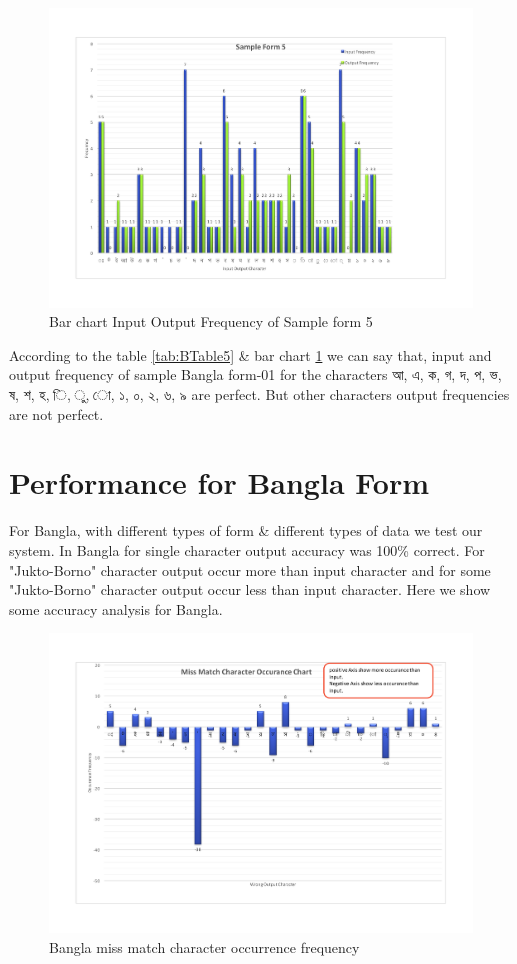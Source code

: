 \begin{figure}[H]
\centering
\includegraphics[width=1\textwidth]{Bform5.pdf}
\caption {Bar chart Input Output Frequency of Sample form 5}
\label {fig:Bbar5}
\end{figure}

According to the table \ref{tab:BTable5} \& bar chart \ref{fig:Bbar5} we can say that, input and output frequency of sample Bangla form-01 for the characters {\bengalifont আ, এ, ক, গ, দ, প, ভ, ষ, শ, হ, ি, ু, ো, ১, ০, ২, ৬, ৯ }are perfect. But other characters output frequencies are not perfect.
\section{Performance for Bangla Form}
For Bangla, with different types of form \& different types of data we test our system. In Bangla for single character output accuracy was 100\% correct. For "Jukto-Borno" character output occur more than input character and for some "Jukto-Borno" character output occur less than input character. Here we show some accuracy analysis for Bangla.
\begin{figure}[H]
\centering
\includegraphics[width=1\textwidth]{BOccurance.pdf}
\caption {Bangla miss match character occurrence frequency}
\label {fig:BAccuracy}
\end{figure}

